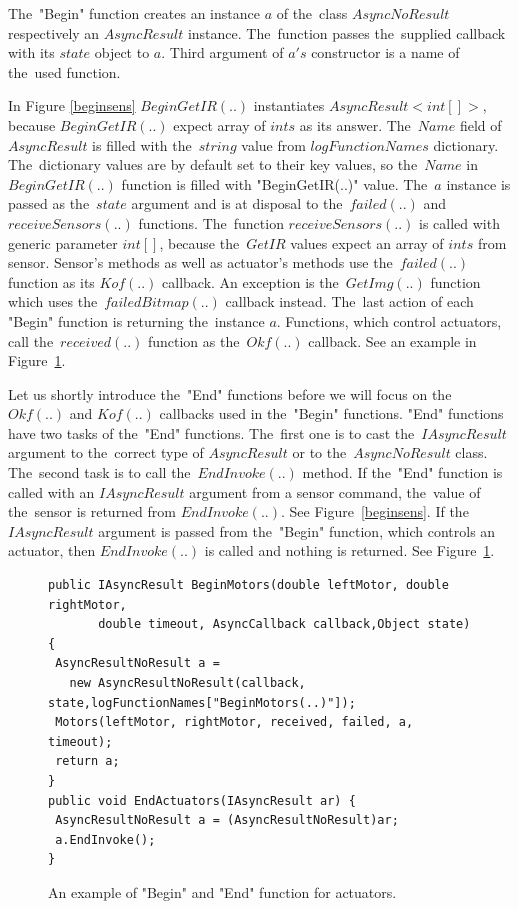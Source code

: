   The~"Begin" function creates an instance $a$ of the~class $AsyncNoResult$ respectively an $AsyncResult$ instance. 
  The~function passes the~supplied callback with its $state$ object to
  $a$. Third argument of $a's$ constructor is a name of the~used function.

  In Figure \ref{beginsens}  $BeginGetIR(..)$ instantiates $AsyncResult<int[]>$, because $BeginGetIR(..)$
  expect array of $ints$ as its answer. 
  The~$Name$ field of $AsyncResult$ is filled with the~$string$ value from $logFunctionNames$ dictionary. 
  The~dictionary values are by default set to their key values, so
  the~$Name$ in $BeginGetIR(..)$ function is filled with "BeginGetIR(..)" value.
  The~$a$ instance is passed as the~$state$ argument and is at disposal to the~$failed(..)$ and 
  $receiveSensors(..)$ functions.
  The~function $receiveSensors(..)$ is called with generic parameter $int[]$, 
  because the~$GetIR$ values expect an array of $ints$ from sensor.
  Sensor's methods as well as actuator's methods use the~$failed(..)$ function as its $Kof(..)$ callback.
  An exception is the~$GetImg(..)$ function which uses the~$failedBitmap(..)$ callback instead.
  The~last action of each "Begin" function is returning the~instance $a$.
  Functions, which control actuators, call the~$received(..)$ function as the~$Okf(..)$ callback. 
  See an example in Figure~\ref{beginact}.

  Let us shortly introduce the~"End" functions before we will focus on the~$Okf(..)$ and 
  $Kof(..)$ callbacks used in the~"Begin" functions.
  "End" functions have two tasks of the~"End" functions.
  The~first one is to cast the~$IAsyncResult$ argument to the~correct type of $AsyncResult$ 
  or to the~$AsyncNoResult$ class. The~second task is to call the~$EndInvoke(..)$ method.
  If the~"End" function is called with an $IAsyncResult$ argument from a sensor command, 
  the~value of the~sensor is returned from $EndInvoke(..)$. See Figure~\ref{beginsens}. 
  If the~$IAsyncResult$ argument is passed from the~"Begin" function, 
  which controls an actuator, then $EndInvoke(..)$ is called and nothing is returned. See Figure~\ref{beginact}.
  
\begin{figure}[!hbp]
\begin{lstlisting}
public IAsyncResult BeginMotors(double leftMotor, double rightMotor, 
       double timeout, AsyncCallback callback,Object state) {
 AsyncResultNoResult a = 
   new AsyncResultNoResult(callback, state,logFunctionNames["BeginMotors(..)"]);
 Motors(leftMotor, rightMotor, received, failed, a, timeout);
 return a;
}
public void EndActuators(IAsyncResult ar) {
 AsyncResultNoResult a = (AsyncResultNoResult)ar;
 a.EndInvoke();
}
\end{lstlisting}	
\caption{An example of "Begin" and "End" function for actuators.} \label{beginact}
\end{figure}
 

